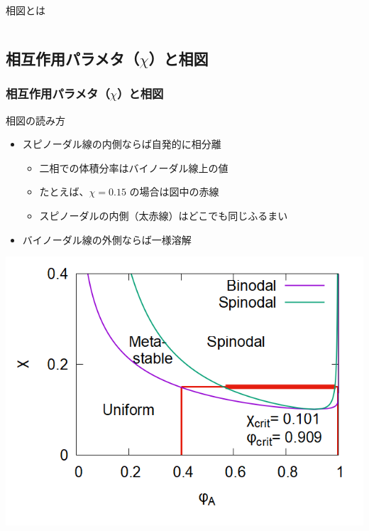 \documentclass[12pt, dvipdfmx]{beamer}
\begin{document}
\begin{frame}
\begin{columns}[c, onlytextwidth]
\begin{exampleblock}{相図とは}
        \end{exampleblock}
    \end{columns}
\end{frame}

\subsection{相互作用パラメタ（$\chi$）と相図}
\begin{frame}\frametitle{相互作用パラメタ（$\chi$）と相図}
    \begin{block}{相図の読み方}
        \begin{itemize}
            \item スピノーダル線の内側ならば自発的に相分離
            \begin{itemize}
                \item 二相での体積分率はバイノーダル線上の値
                \item たとえば、$\chi=0.15$ の場合は図中の赤線
                \item スピノーダルの内側（太赤線）はどこでも同じふるまい
            \end{itemize}
            \item バイノーダル線の外側ならば一様溶解
        \end{itemize}
        \centering
		\includegraphics[width=.45\textwidth]{PD_6_600_4.png}
    \end{block}
\end{frame}
\end{document}
